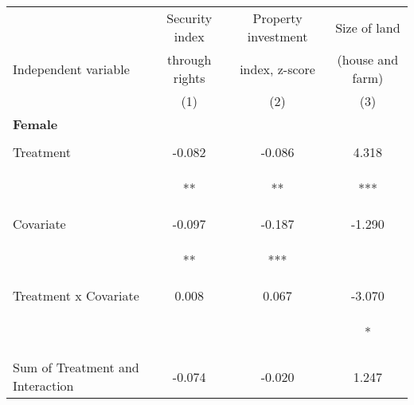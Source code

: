 \begin{tabular}{lccc}
\hline \noalign{\smallskip} & Security index & Property investment & Size of land\\
Independent variable & through rights & index, z-score & (house and farm)\\
 & (1) & (2) & (3)\\
\noalign{\smallskip}\hline \noalign{\smallskip}\textbf{Female} &  &  & \\
 & \begin{footnotesize}\end{footnotesize} & \begin{footnotesize}\end{footnotesize} & \begin{footnotesize}\end{footnotesize}\\
\noalign{\smallskip}Treatment & -0.082 & -0.086 & 4.318\\
 & \begin{footnotesize}[0.041]**\end{footnotesize} & \begin{footnotesize}[0.038]**\end{footnotesize} & \begin{footnotesize}[1.358]***\end{footnotesize}\\
\noalign{\smallskip}Covariate & -0.097 & -0.187 & -1.290\\
 & \begin{footnotesize}[0.042]**\end{footnotesize} & \begin{footnotesize}[0.035]***\end{footnotesize} & \begin{footnotesize}[1.323]\end{footnotesize}\\
\noalign{\smallskip}Treatment x Covariate & 0.008 & 0.067 & -3.070\\
 & \begin{footnotesize}[0.056]\end{footnotesize} & \begin{footnotesize}[0.048]\end{footnotesize} & \begin{footnotesize}[1.821]*\end{footnotesize}\\
\noalign{\smallskip}Sum of Treatment and Interaction & -0.074 & -0.020 & 1.247\\

\end{tabular}
